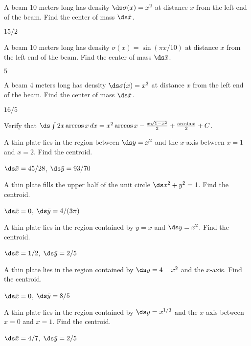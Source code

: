 \begin{exercises}

\exercise A beam 10 meters long has density $\ds \sigma(x)=x^2$ at
distance $x$ from the left end of the beam. Find the center of mass
$\ds \bar x$.
\begin{answer} $15/2$
\end{answer}

\exercise A beam 10 meters long has density $\sigma(x)=\sin(\pi x/10)$ at
distance $x$ from the left end of the beam. Find the center of mass
$\ds \bar x$.
\begin{answer} $5$
\end{answer}

\exercise A beam 4 meters long has density $\ds \sigma(x)=x^3$ at
distance $x$ from the left end of the beam. Find the center of mass
$\ds \bar x$.
\begin{answer} $16/5$
\end{answer}

\exercise Verify that $\ds\int 2x\arccos x\,dx=
x^2\arccos x-{x\sqrt{1-x^2}\over2}+{\arcsin x\over 2}+C$.

\exercise A thin plate lies in the region between $\ds y=x^2$ and the $x$-axis
between $x=1$ and $x=2$. Find the centroid.
\begin{answer} $\ds \bar x=45/28$, $\ds \bar y = 93/70$
\end{answer}

\exercise A thin plate fills the upper half of the unit circle
$\ds x^2+y^2=1$. Find the centroid.
\begin{answer} $\ds \bar x=0$, $\ds \bar y=4/(3\pi)$
\end{answer}

\exercise A thin plate lies in the region contained by $y=x$ and
$\ds y=x^2$. Find the centroid.
\begin{answer} $\ds \bar x=1/2$, $\ds \bar y=2/5$
\end{answer}

\exercise A thin plate lies in the region contained by $\ds y=4-x^2$ and
the $x$-axis. Find the centroid.
\begin{answer} $\ds \bar x=0$, $\ds \bar y=8/5$
\end{answer}

\exercise A thin plate lies in the region contained by $\ds y=x^{1/3}$ and
the $x$-axis between $x=0$ and $x=1$. Find the centroid.
\begin{answer} $\ds \bar x=4/7$, $\ds \bar y=2/5$
\end{answer}


\end{exercises}
